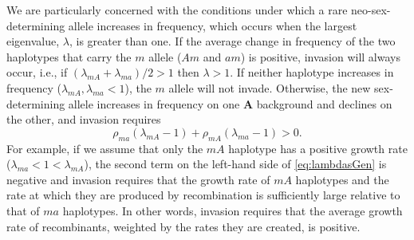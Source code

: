 \documentclass[12pt]{article}
\begin{document}

We are particularly concerned with the conditions under which a rare neo-sex-determining allele increases in frequency, which occurs when the largest eigenvalue, $\lambda$, is greater than one. 
If the average change in frequency of the two haplotypes that carry the $m$ allele ($Am$ and $am$) is positive, invasion will always occur, i.e., if $(\lambda_{mA} + \lambda_{ma})/2 > 1$ then $\lambda > 1$. 
If neither haplotype increases in frequency ($\lambda_{mA}, \lambda_{ma} < 1$), the $m$ allele will not invade. 
Otherwise, the new sex-determining allele increases in frequency on one \textbf{A} background and declines on the other, and invasion requires 
\begin{equation}\label{eq:lambdasGen}
\rho_{ma}\left(\lambda_{mA}-1\right)+\rho_{mA}\left(\lambda_{ma}-1\right)>0.
\end{equation}
\noindent For example, if we assume that only the $mA$ haplotype has a positive growth rate ($\lambda_{ma}<1<\lambda_{mA}$), the second term on the left-hand side of \eqref{eq:lambdasGen} is negative and invasion requires that the growth rate of $mA$ haplotypes and the rate at which they are produced by recombination is sufficiently large relative to that of $ma$ haplotypes.
In other words, invasion requires that the average growth rate of recombinants, weighted by the rates they are created, is positive.
\end{document}

